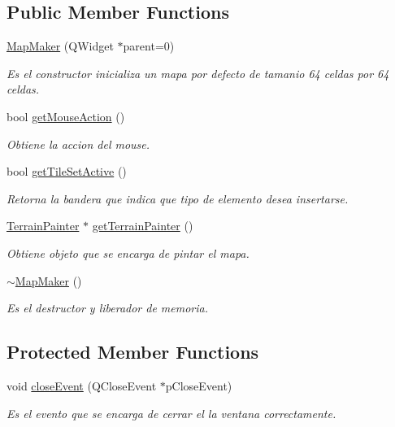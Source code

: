 \subsection*{Public Member Functions}
\begin{DoxyCompactItemize}
\item 
\hyperlink{class_map_maker_a45cd33bb40e93ad7c96171240e87a7bd}{Map\-Maker} (Q\-Widget $\ast$parent=0)
\begin{DoxyCompactList}\small\item\em Es el constructor inicializa un mapa por defecto de tamanio 64 celdas por 64 celdas. \end{DoxyCompactList}\item 
bool \hyperlink{class_map_maker_ac56883ea2ed2c8d85824ba94f960a504}{get\-Mouse\-Action} ()
\begin{DoxyCompactList}\small\item\em Obtiene la accion del mouse. \end{DoxyCompactList}\item 
bool \hyperlink{class_map_maker_a35b3c5bae988e2dce39926ef6240ab10}{get\-Tile\-Set\-Active} ()
\begin{DoxyCompactList}\small\item\em Retorna la bandera que indica que tipo de elemento desea insertarse. \end{DoxyCompactList}\item 
\hyperlink{class_terrain_painter}{Terrain\-Painter} $\ast$ \hyperlink{class_map_maker_a6c01882f3158db7f771f12460bff31b1}{get\-Terrain\-Painter} ()
\begin{DoxyCompactList}\small\item\em Obtiene objeto que se encarga de pintar el mapa. \end{DoxyCompactList}\item 
\hypertarget{class_map_maker_a270d6592f31c8026c809501ff4f2c2b9}{\hyperlink{class_map_maker_a270d6592f31c8026c809501ff4f2c2b9}{$\sim$\-Map\-Maker} ()}\label{class_map_maker_a270d6592f31c8026c809501ff4f2c2b9}

\begin{DoxyCompactList}\small\item\em Es el destructor y liberador de memoria. \end{DoxyCompactList}\end{DoxyCompactItemize}
\subsection*{Protected Member Functions}
\begin{DoxyCompactItemize}
\item 
void \hyperlink{class_map_maker_a1dced69406f01f92ae06b7965c0b90bc}{close\-Event} (Q\-Close\-Event $\ast$p\-Close\-Event)
\begin{DoxyCompactList}\small\item\em Es el evento que se encarga de cerrar el la ventana correctamente. \end{DoxyCompactList}\end{DoxyCompactItemize}


